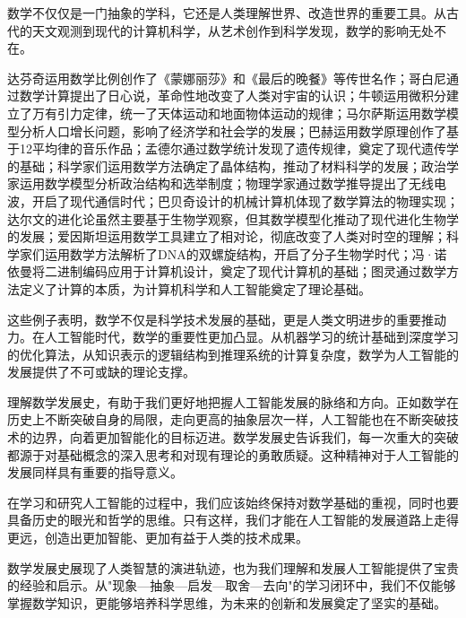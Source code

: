 数学不仅仅是一门抽象的学科，它还是人类理解世界、改造世界的重要工具。从古代的天文观测到现代的计算机科学，从艺术创作到科学发现，数学的影响无处不在。

达芬奇运用数学比例创作了《蒙娜丽莎》和《最后的晚餐》等传世名作；哥白尼通过数学计算提出了日心说，革命性地改变了人类对宇宙的认识；牛顿运用微积分建立了万有引力定律，统一了天体运动和地面物体运动的规律；马尔萨斯运用数学模型分析人口增长问题，影响了经济学和社会学的发展；巴赫运用数学原理创作了基于12平均律的音乐作品；孟德尔通过数学统计发现了遗传规律，奠定了现代遗传学的基础；科学家们运用数学方法确定了晶体结构，推动了材料科学的发展；政治学家运用数学模型分析政治结构和选举制度；物理学家通过数学推导提出了无线电波，开启了现代通信时代；巴贝奇设计的机械计算机体现了数学算法的物理实现；达尔文的进化论虽然主要基于生物学观察，但其数学模型化推动了现代进化生物学的发展；爱因斯坦运用数学工具建立了相对论，彻底改变了人类对时空的理解；科学家们运用数学方法解析了DNA的双螺旋结构，开启了分子生物学时代；冯·诺依曼将二进制编码应用于计算机设计，奠定了现代计算机的基础；图灵通过数学方法定义了计算的本质，为计算机科学和人工智能奠定了理论基础。

这些例子表明，数学不仅是科学技术发展的基础，更是人类文明进步的重要推动力。在人工智能时代，数学的重要性更加凸显。从机器学习的统计基础到深度学习的优化算法，从知识表示的逻辑结构到推理系统的计算复杂度，数学为人工智能的发展提供了不可或缺的理论支撑。

理解数学发展史，有助于我们更好地把握人工智能发展的脉络和方向。正如数学在历史上不断突破自身的局限，走向更高的抽象层次一样，人工智能也在不断突破技术的边界，向着更加智能化的目标迈进。数学发展史告诉我们，每一次重大的突破都源于对基础概念的深入思考和对现有理论的勇敢质疑。这种精神对于人工智能的发展同样具有重要的指导意义。

在学习和研究人工智能的过程中，我们应该始终保持对数学基础的重视，同时也要具备历史的眼光和哲学的思维。只有这样，我们才能在人工智能的发展道路上走得更远，创造出更加智能、更加有益于人类的技术成果。

数学发展史展现了人类智慧的演进轨迹，也为我们理解和发展人工智能提供了宝贵的经验和启示。从"现象—抽象—启发—取舍—去向"的学习闭环中，我们不仅能够掌握数学知识，更能够培养科学思维，为未来的创新和发展奠定了坚实的基础。